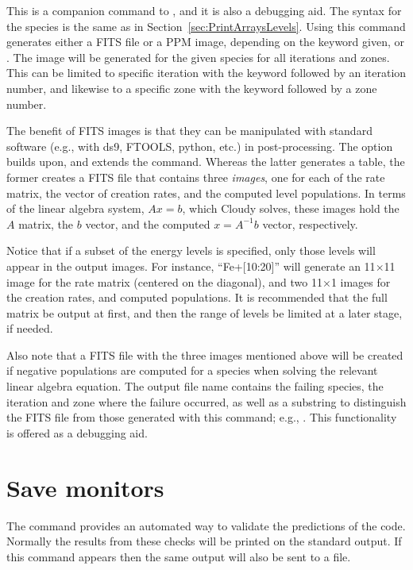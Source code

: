 This is a companion command to , and it is also a
debugging aid.
The syntax for the species is the same as in Section~\ref{sec:PrintArraysLevels}.
Using this command generates either a FITS file or a PPM image, depending on the
keyword given,  or .
The image will be generated for the given species for all iterations and zones.
This can be limited to specific iteration with the keyword
 followed by an iteration number, and likewise to
a specific zone with the keyword  followed by a zone number.

The benefit of FITS images is that they can be manipulated with standard
software (e.g., with ds9, FTOOLS, python, etc.) in post-processing.
The  option builds upon, and extends the 
command.
Whereas the latter generates a table, the former creates a FITS file that
contains three {\it images}, one for each of the rate matrix, the vector of
creation rates, and the computed level populations.
In terms of the linear algebra system, $A x = b$, which Cloudy solves, these
images hold the $A$ matrix, the $b$ vector, and the computed $x = A^{-1} b$
vector, respectively.

Notice that if a subset of the energy levels is specified, only those levels
will appear in the output images.
For instance, ``Fe+[10:20]'' will generate an 11$\times$11 image for the rate
matrix (centered on the diagonal), and two 11$\times$1 images for the creation
rates, and computed populations.
It is recommended that the full matrix be output at first, and then the range of
levels be limited at a later stage, if needed.

Also note that a FITS file with the three images mentioned above will be created
if negative populations are computed for a species when solving the relevant
linear algebra equation.
The output file name contains the failing species, the iteration and zone where
the failure occurred, as well as a substring to distinguish the FITS file from
those generated with this command; e.g.,
.
This functionality is offered as a debugging aid.

\section{Save monitors}
\label{sec:SaveMonitorsCommand}

The  command provides
an automated way to validate the predictions of the code.
Normally the
results from these checks will be printed on the standard output.
If this
command appears then the same output will also be sent to a file.

